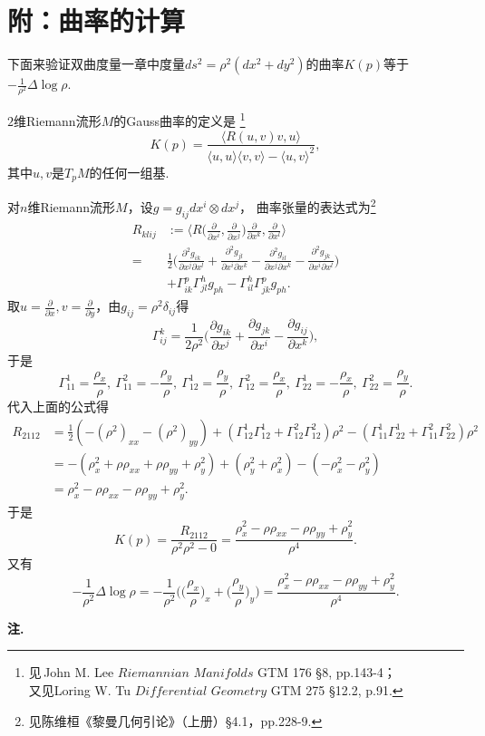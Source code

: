 \section*{附：曲率的计算}
下面来验证双曲度量一章中度量$ds^2=\rho^2(dx^2+dy^2)$的曲率$K(p)$等于
$-\frac{1}{\rho^2}\Delta\log\rho$.

$2$维Riemann流形$M$的Gauss曲率的定义是
\footnote{见$\,$John M. Lee $\textit{Riemannian Manifolds}$ GTM 176 \S 8, pp.143-4；\\
又见Loring W. Tu $\textit{Differential Geometry}$ GTM 275 \S12.2, p.91.}
$$K(p)=\frac{\langle R(u,v)v,u\rangle}{\langle u,u\rangle\langle v,v\rangle-\langle u,v\rangle^2},$$
其中$u,v$是$T_pM$的任何一组基.

对$n$维Riemann流形$M$，设$g=g_{ij}dx^i\otimes dx^j$，
曲率张量的表达式为\footnote{见陈维桓《黎曼几何引论》（上册）\S4.1，pp.228-9.}
\begin{align*}
    R_{klij}&:=\Big\langle R\Big(\frac{\partial}{\partial x^i},\frac{\partial}{\partial x^j}\Big)\frac{\partial}{\partial x^k},\frac{\partial}{\partial x^l}\Big\rangle\\
    =\,&\frac{1}{2}\Big(\frac{\partial^2g_{ik}}{\partial x^j\partial x^l}+\frac{\partial^2g_{jl}}{\partial x^i\partial x^k}-\frac{\partial^2g_{il}}{\partial x^j\partial x^k}-\frac{\partial^2g_{jk}}{\partial x^i\partial x^l}\Big)\\
    &+\Gamma_{ik}^p\Gamma_{jl}^hg_{ph}-\Gamma_{il}^h\Gamma_{jk}^pg_{ph}.
\end{align*}
取$u=\frac{\partial}{\partial x},v=\frac{\partial}{\partial y}$，由$g_{ij}=\rho^2\delta_{ij}$得
$$\Gamma_{ij}^k=\frac{1}{2\rho^2}\Big(\frac{\partial g_{ik}}{\partial x^j}+\frac{\partial g_{jk}}{\partial x^i}-\frac{\partial g_{ij}}{\partial x^k}\Big),$$
于是
$$\Gamma_{11}^1=\frac{\rho_x}{\rho},\ \Gamma_{11}^2=-\frac{\rho_y}{\rho},\ 
\Gamma_{12}^1=\frac{\rho_y}{\rho},\ \Gamma_{12}^2=\frac{\rho_x}{\rho},\ 
\Gamma_{22}^1=-\frac{\rho_x}{\rho},\ \Gamma_{22}^2=\frac{\rho_y}{\rho}.$$
代入上面的公式得
\begin{align*}
R_{2112}&=\frac{1}{2}(-(\rho^2)_{xx}-(\rho^2)_{yy})+(\Gamma_{12}^1\Gamma_{12}^1+\Gamma_{12}^2\Gamma_{12}^2)\rho^2-(\Gamma_{11}^1\Gamma_{22}^1+\Gamma_{11}^2\Gamma_{22}^2)\rho^2\\
&=-(\rho_x^2+\rho\rho_{xx}+\rho\rho_{yy}+\rho_y^2)+(\rho_y^2+\rho_x^2)-(-\rho_x^2-\rho_y^2)\\
&=\rho_x^2-\rho\rho_{xx}-\rho\rho_{yy}+\rho_y^2.
\end{align*}
于是
$$K(p)=\frac{R_{2112}}{\rho^2\rho^2-0}=\frac{\rho_x^2-\rho\rho_{xx}-\rho\rho_{yy}+\rho_y^2}{\rho^4}.$$
又有
$$-\frac{1}{\rho^2}\Delta\log\rho=-\frac{1}{\rho^2}\Big(\Big(\frac{\rho_x}{\rho}\Big)_x+\Big(\frac{\rho_y}{\rho}\Big)_y\Big)=\frac{\rho_x^2-\rho\rho_{xx}-\rho\rho_{yy}+\rho_y^2}{\rho^4}.$$

\textbf{注.}
\printfootnotes